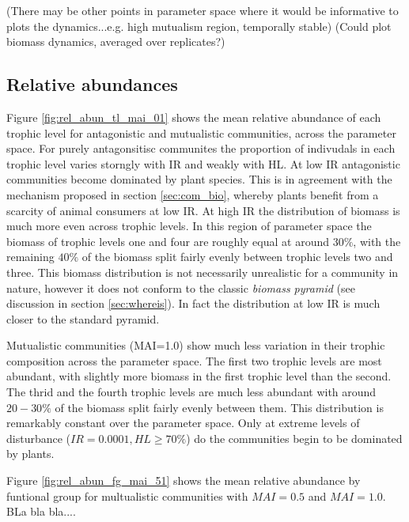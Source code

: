 \begin{itemize}
(There may be other points in parameter space where it would be informative to plots the dynamics...e.g. high mutualism region, temporally stable)
(Could plot biomass dynamics, averaged over replicates?)

\newpage
\subsection{Relative abundances}
\label{sec:rel_abun}

Figure \ref{fig:rel_abun_tl_mai_01} shows the mean relative abundance of each trophic level for antagonistic and mutualistic communities, across the parameter space.  For purely antagonsitisc communites the proportion of indivudals in each trophic level varies storngly with IR and weakly with HL. At low IR antagonistic communities become dominated by plant species. This is in agreement with the mechanism proposed in section \ref{sec:com_bio}, whereby plants benefit from a scarcity of animal consumers at low IR. At high IR the distribution of biomass is much more even across trophic levels. In this region of parameter space the biomass of trophic levels one and four are roughly equal at around $30\%$, with the remaining $40\%$ of the biomass split fairly evenly between trophic levels two and three. This biomass distribution is not necessarily unrealistic for a community in nature, however it does not conform to the classic \emph{biomass pyramid} (see discussion in section \ref{sec:whereis}). In fact the distribution at low IR is much closer to the standard pyramid.

Mutualistic communities (MAI=1.0) show much less variation in their trophic composition across the parameter space. The first two trophic levels are most abundant, with slightly more biomass in the first trophic level than the second. The thrid and the fourth trophic levels are much less abundant with around $20-30\%$ of the biomass split fairly evenly between them. This distribution is remarkably constant over the parameter space. Only at extreme levels of disturbance ($IR=0.0001, HL\geq 70 \%$) do the communities begin to be dominated by plants. 

Figure \ref{fig:rel_abun_fg_mai_51} shows the mean relative abundance by funtional group for multualistic communities with $MAI=0.5$ and $MAI=1.0$.    BLa bla bla....




\end{itemize}
